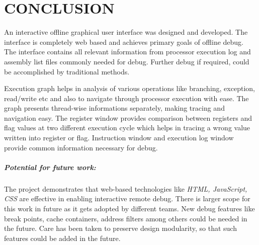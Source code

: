 \chapter{CONCLUSION}
\label{chap:GUI_conclusion}

An interactive offline graphical user interface was designed and developed. The interface is completely web based and achieves primary goals of offline debug. The interface contains all relevant information from processor execution log and assembly list files commonly needed for debug. Further debug if required, could be accomplished by traditional methods.

Execution graph helps in analysis of various operations like branching, exception, read/write etc and also to navigate through processor execution with ease. The graph presents thread-wise informations separately, making tracing and navigation easy. The register window provides comparison between registers and flag values at two different execution cycle which helps in tracing a wrong value written into register or flag. Instruction window and execution log window provide common information necessary for debug.

\paragraph{Potential for future work:} The project demonstrates that web-based technologies like {\it HTML, JavaScript, CSS} are effective in enabling interactive remote debug. There is larger scope for this work in future as it gets adopted by different teams. New debug features like break points, cache containers, address filters among others could be needed in the future. Care has been taken to preserve design modularity, so that such features could  be added in the future.

